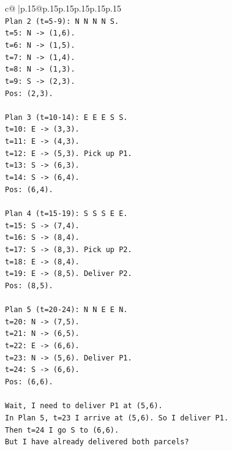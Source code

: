 \documentclass{article}
\begin{document}
{\begin{supertabular}{c@{$\;$}|p{.15\linewidth}@{}p{.15\linewidth}p{.15\linewidth}p{.15\linewidth}p{.15\linewidth}p{.15\linewidth}}
{{{\\ 
\texttt{Plan 2 (t=5{-}9): N N N N S.} \\
\texttt{t=5: N {-}> (1,6).} \\
\texttt{t=6: N {-}> (1,5).} \\
\texttt{t=7: N {-}> (1,4).} \\
\texttt{t=8: N {-}> (1,3).} \\
\texttt{t=9: S {-}> (2,3).} \\
\texttt{Pos: (2,3).} \\
\\ 
\texttt{Plan 3 (t=10{-}14): E E E S S.} \\
\texttt{t=10: E {-}> (3,3).} \\
\texttt{t=11: E {-}> (4,3).} \\
\texttt{t=12: E {-}> (5,3). Pick up P1.} \\
\texttt{t=13: S {-}> (6,3).} \\
\texttt{t=14: S {-}> (6,4).} \\
\texttt{Pos: (6,4).} \\
\\ 
\texttt{Plan 4 (t=15{-}19): S S S E E.} \\
\texttt{t=15: S {-}> (7,4).} \\
\texttt{t=16: S {-}> (8,4).} \\
\texttt{t=17: S {-}> (8,3). Pick up P2.} \\
\texttt{t=18: E {-}> (8,4).} \\
\texttt{t=19: E {-}> (8,5). Deliver P2.} \\
\texttt{Pos: (8,5).} \\
\\ 
\texttt{Plan 5 (t=20{-}24): N N E E N.} \\
\texttt{t=20: N {-}> (7,5).} \\
\texttt{t=21: N {-}> (6,5).} \\
\texttt{t=22: E {-}> (6,6).} \\
\texttt{t=23: N {-}> (5,6). Deliver P1.} \\
\texttt{t=24: S {-}> (6,6).} \\
\texttt{Pos: (6,6).} \\
\\ 
\texttt{Wait, I need to deliver P1 at (5,6).} \\
\texttt{In Plan 5, t=23 I arrive at (5,6). So I deliver P1.} \\
\texttt{Then t=24 I go S to (6,6).} \\
\texttt{But I have already delivered both parcels?} \\
}}}
\end{supertabular}}
\end{document}
